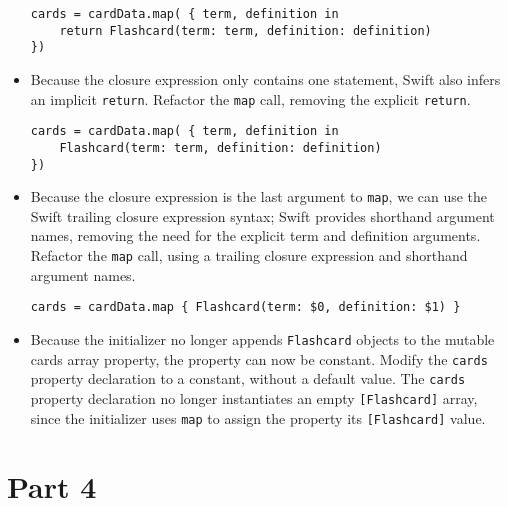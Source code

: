 \documentclass[a4paper,11pt]{scrartcl}
\begin{document}
\begin{itemize}
\begin{lstlisting}
cards = cardData.map( { term, definition in
	return Flashcard(term: term, definition: definition)
})
\end{lstlisting}
\item Because the closure expression only contains one statement, Swift also infers an implicit \texttt{return}. Refactor the \texttt{map} call, removing the explicit \texttt{return}.
\begin{lstlisting}
cards = cardData.map( { term, definition in
	Flashcard(term: term, definition: definition)
})
\end{lstlisting}
\item Because the closure expression is the last argument to \texttt{map}, we can use the Swift trailing closure expression syntax; Swift provides shorthand argument names, removing the need for the explicit term and definition arguments. Refactor the \texttt{map} call, using a trailing closure expression and shorthand argument names.
\begin{lstlisting}
cards = cardData.map { Flashcard(term: $0, definition: $1) }
\end{lstlisting}
\item Because the initializer no longer appends \texttt{Flashcard} objects to the mutable cards array property, the property can now be constant. Modify the \texttt{cards} property declaration to a constant, without a default value. The \texttt{cards} property declaration no longer instantiates an empty \texttt{[Flashcard]} array, since the initializer uses \texttt{map} to assign the property its \texttt{[Flashcard]} value.
\end{itemize}

\section*{Part 4}
\end{document}
